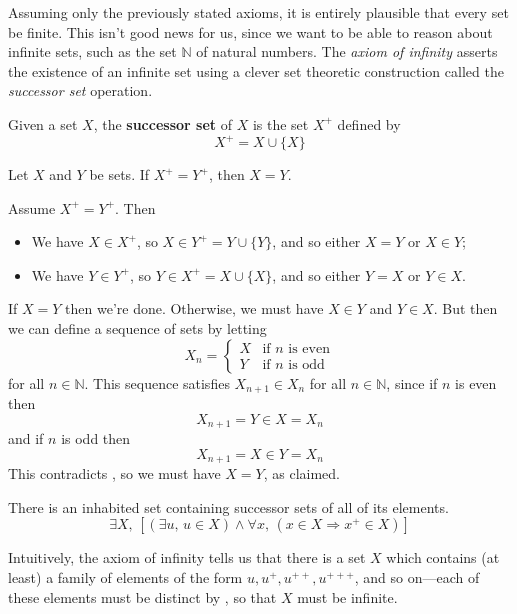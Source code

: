 Assuming only the previously stated axioms, it is entirely plausible that every set be finite. This isn't good news for us, since we want to be able to reason about infinite sets, such as the set $\mathbb{N}$ of natural numbers. The \textit{axiom of infinity} asserts the existence of an infinite set using a clever set theoretic construction called the \textit{successor set} operation.

\begin{definition}
\label{defSuccessorSet}
\label{successor set}
Given a set $X$, the \textbf{successor set} of $X$ is the set $X^+$ defined by
\[ X^+ = X \cup \{ X \} \]
\end{definition}

\begin{lemma}
\label{lemSuccessorSetIsInjective}
Let $X$ and $Y$ be sets. If $X^+ = Y^+$, then $X=Y$.
\end{lemma}

\begin{cproof}
Assume $X^+=Y^+$. Then
\begin{itemize}
\item We have $X \in X^+$, so $X \in Y^+ = Y \cup \{ Y \}$, and so either $X = Y$ or $X \in Y$;
\item We have $Y \in Y^+$, so $Y \in X^+ = X \cup \{ X \}$, and so either $Y = X$ or $Y \in X$.
\end{itemize}
If $X=Y$ then we're done. Otherwise, we must have $X \in Y$ and $Y \in X$. But then we can define a sequence of sets by letting
\[ X_n = \begin{cases} X & \text{if } n \text{ is even} \\ Y & \text{if } n \text{ is odd} \end{cases} \]
for all $n \in \mathbb{N}$. This sequence satisfies $X_{n+1} \in X_n$ for all $n \in \mathbb{N}$, since if $n$ is even then
\[ X_{n+1} = Y \in X = X_n \]
and if $n$ is odd then
\[ X_{n+1} = X \in Y = X_n \]
This contradicts , so we must have $X=Y$, as claimed.
\end{cproof}

\begin{axiom}
\label{axZFCInfinity}
There is an inhabited set containing successor sets of all of its elements.
\[ \exists X,\, [(\exists u,\, u \in X) \wedge \forall x,\, (x \in X \Rightarrow x^+ \in X)] \]
\end{axiom}

Intuitively, the axiom of infinity tells us that there is a set $X$ which contains (at least) a family of elements of the form $u, u^+, u^{++}, u^{+++}$, and so on---each of these elements must be distinct by , so that $X$ must be infinite.

